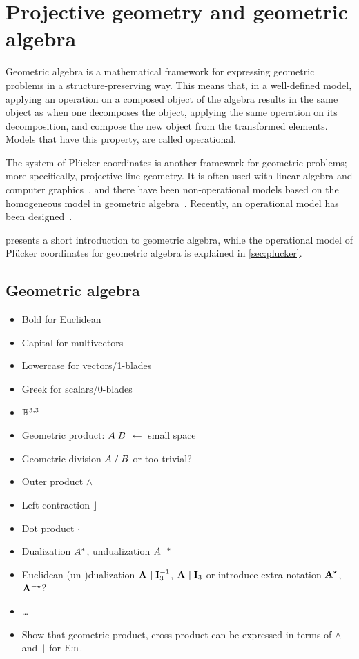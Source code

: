 \section{Projective geometry and geometric algebra}
\label{ch:background}

Geometric algebra is a mathematical framework for expressing geometric problems in a structure-preserving way.  This means that, in a well-defined model, applying an operation on a composed object of the algebra results in the same object as when one decomposes the object, applying the same operation on its decomposition, and compose the new object from the transformed elements.  Models that have this property, are called operational.

The system of Pl\"ucker coordinates is another framework for geometric problems; more specifically, projective line geometry.  It is often used with linear algebra and computer graphics~\cite{Shoemake}, and there have been non-operational models based on the homogeneous model in geometric algebra~\cite[Chapter 12]{TheBook}.  Recently, an operational model has been designed~\cite{Hongbo}.

 presents a short introduction to geometric algebra, while the operational model of Pl\"ucker coordinates for geometric algebra is explained in \autoref{sec:plucker}.

\subsection{Geometric algebra}
\label{sec:intro-ga}


\begin{itemize}
  \item Bold for Euclidean
  \item Capital for multivectors
  \item Lowercase for vectors/1-blades
  \item Greek for scalars/0-blades
  \item $\mathbb{R}^{3,3}$
  \item Geometric product: $A \; B$ $\leftarrow$ small space
  \item Geometric division $A \mathbin{/} B$ or too trivial?
  \item Outer product $\wedge$
  \item Left contraction $\mathbin{\rfloor}$
  \item Dot product $\mathbin{\cdot}$
  \item Dualization $A^\ast$, undualization $A^{-\ast}$
  \item Euclidean (un-)dualization $\mathbf{A} \mathbin{\rfloor} \mathbf{I}_3^{-1}$, $\mathbf{A} \mathbin{\rfloor} \mathbf{I}_3$ or introduce extra notation $\mathbf{A}^{\star}$, $\mathbf{A}^{-\star}$?
  \item \ldots
  \item Show that geometric product, cross product can be expressed in terms of $\wedge$ and $\mathbin{\rfloor}$ for $\operatorname{Em}$.
\end{itemize}

